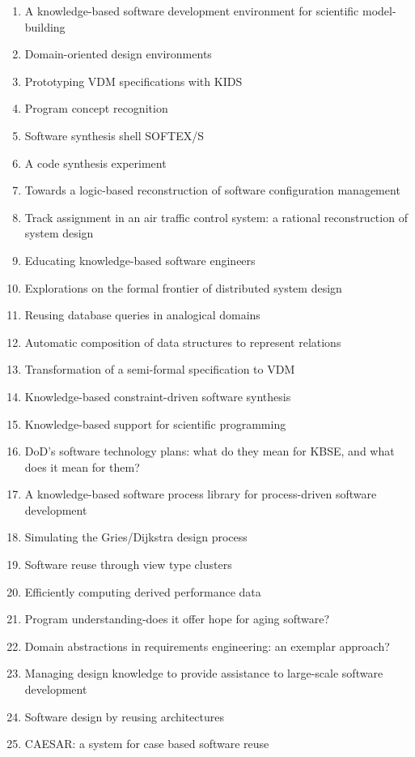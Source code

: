 \begin{enumerate}[itemsep=-1ex]
  \item A knowledge-based software development environment for scientific model-building
  \item Domain-oriented design environments
  \item Prototyping VDM specifications with KIDS
  \item Program concept recognition
  \item Software synthesis shell SOFTEX/S
  \item A code synthesis experiment
  \item Towards a logic-based reconstruction of software configuration management
  \item Track assignment in an air traffic control system: a rational reconstruction of system design
  \item Educating knowledge-based software engineers
  \item Explorations on the formal frontier of distributed system design
  \item Reusing database queries in analogical domains
  \item Automatic composition of data structures to represent relations
  \item Transformation of a semi-formal specification to VDM
  \item Knowledge-based constraint-driven software synthesis
  \item Knowledge-based support for scientific programming
  \item DoD's software technology plans: what do they mean for KBSE, and what does it mean for them?
  \item A knowledge-based software process library for process-driven software development
  \item Simulating the Gries/Dijkstra design process
  \item Software reuse through view type clusters
  \item Efficiently computing derived performance data
  \item Program understanding-does it offer hope for aging software?
  \item Domain abstractions in requirements engineering: an exemplar approach?
  \item Managing design knowledge to provide assistance to large-scale software development
  \item Software design by reusing architectures
  \item CAESAR: a system for case based software reuse
\end{enumerate}

